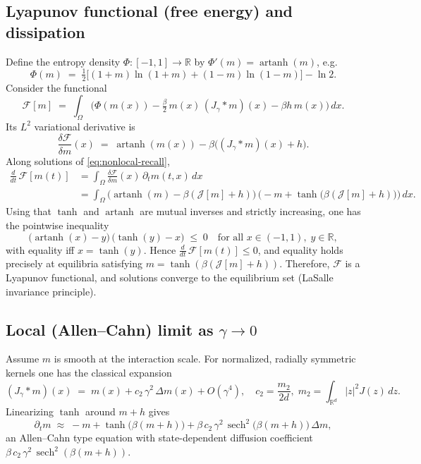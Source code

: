 \documentclass[11pt,a4paper]{article}
\begin{document}
\subsection{Lyapunov functional (free energy) and dissipation}
Define the entropy density $\Phi:[-1,1]\to\mathbb{R}$ by $\Phi'(m)=\operatorname{artanh}(m)$, e.g.
\begin{equation}\label{eq:entropy}
 \Phi(m) \;=\; \tfrac12\Big[(1+m)\ln(1+m)+(1-m)\ln(1-m)\Big] - \ln 2.
\end{equation}
Consider the functional
\begin{equation}\label{eq:free_energy}
 \mathcal{F}[m] \;=\; \int_\Omega \Big( \Phi(m(x)) - \tfrac{\beta}{2}\,m(x)\,(J_\gamma*m)(x) - \beta h\,m(x) \Big)\,dx.
\end{equation}
Its $L^2$ variational derivative is
\begin{equation}\label{eq:variational}
 \frac{\delta \mathcal{F}}{\delta m}(x) \;=\; \operatorname{artanh}(m(x)) - \beta\Big((J_\gamma*m)(x)+h\Big).
\end{equation}
Along solutions of \eqref{eq:nonlocal-recall},
\begin{align}
 \frac{d}{dt}\,\mathcal{F}[m(t)]
 &= \int_\Omega \frac{\delta \mathcal{F}}{\delta m}(x)\,\partial_t m(t,x)\,dx \\
 &= \int_\Omega \Big( \operatorname{artanh}(m) - \beta(\mathcal{J}[m]+h) \Big)\,\Big( -m + \tanh\big(\beta(\mathcal{J}[m]+h)\big) \Big)\,dx.
\end{align}
Using that $\tanh$ and $\operatorname{artanh}$ are mutual inverses and strictly increasing, one has the pointwise inequality
\[
 \big(\operatorname{artanh}(x) - y\big)\,\big(\tanh(y) - x\big) \;\le\; 0\quad \text{for all } x\in(-1,1),\; y\in\mathbb{R},
\]
with equality iff $x=\tanh(y)$. Hence $\tfrac{d}{dt}\,\mathcal{F}[m(t)] \le 0$, and equality holds precisely at equilibria satisfying $m = \tanh(\beta(\mathcal{J}[m]+h))$. Therefore, $\mathcal{F}$ is a Lyapunov functional, and solutions converge to the equilibrium set (LaSalle invariance principle).

\subsection{Local (Allen--Cahn) limit as $\gamma\to0$}
Assume $m$ is smooth at the interaction scale. For normalized, radially symmetric kernels one has the classical expansion
\begin{equation}\label{eq:conv_expansion}
 (J_\gamma*m)(x) \;=\; m(x) + c_2\,\gamma^2\,\Delta m(x) + O(\gamma^4),\quad c_2 = \frac{m_2}{2d},\; m_2=\int_{\mathbb{R}^d}|z|^2 J(z)\,dz.
\end{equation}
Linearizing $\tanh$ around $m+h$ gives
\begin{equation}
 \partial_t m \;\approx\; -m + \tanh\big(\beta(m+h)\big) + \beta\,c_2\,\gamma^2\,\operatorname{sech}^2\!\big(\beta(m+h)\big)\,\Delta m,
\end{equation}
an Allen--Cahn type equation with state-dependent diffusion coefficient $\beta\,c_2\,\gamma^2\,\operatorname{sech}^2(\beta(m+h))$.
\end{document}

